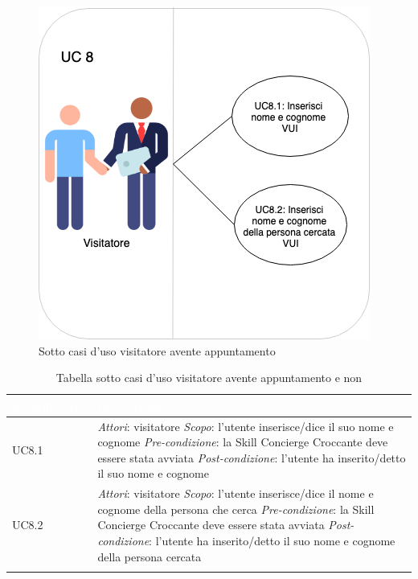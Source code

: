 \begin{figure}[H] 
    \centering 
    \includegraphics[width=0.7\columnwidth]{immagini/casi_duso21.png}
    \caption{\label{fig:sotto_casi_duso_visitatore2}Sotto casi d'uso visitatore avente appuntamento}
\end{figure}
\begin{center}
	\centering
	\renewcommand{\arraystretch}{1.5}
	\begin{longtable}{  p{2.5cm} p{9.8cm} }
		\rowcolor{tableHead}
		\textbf{\textcolor{white}{Identificativo}} & \textbf{\textcolor{white}{Descrizione}} \\
		\endhead  
		
		UC8.1 &  \textit{Attori}: visitatore  \newline \textit{Scopo}: l'utente inserisce/dice il suo nome e cognome \newline \textit{Pre-condizione}: la Skill Concierge Croccante deve essere stata avviata \newline \textit{Post-condizione}: l'utente ha inserito/detto il suo nome e cognome \\
		
		UC8.2 &  \textit{Attori}: visitatore   \newline \textit{Scopo}: l'utente inserisce/dice il nome e cognome della persona che cerca \newline \textit{Pre-condizione}: la Skill Concierge Croccante deve essere stata avviata \newline \textit{Post-condizione}: l'utente ha inserito/detto il suo nome e cognome della persona cercata \\

		\rowcolor{white}
		\caption{Tabella sotto casi d'uso visitatore avente appuntamento e non}
	\end{longtable}
\end{center}
